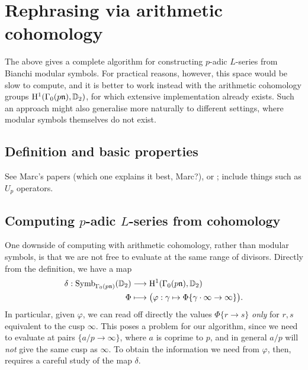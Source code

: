 \documentclass[a4paper,10pt]{article}
\numberwithin{equation}{section}
\begin{document}


\section{Rephrasing via arithmetic cohomology}
The above gives a complete algorithm for constructing $p$-adic $L$-series from Bianchi modular symbols. For practical reasons, however, this space would be slow to compute, and it is better to work instead with the arithmetic cohomology groups $\mathrm{H}^1(\Gamma_0(p\mathfrak{n}),\mathbb{D}_2)$, for which extensive implementation already exists. Such an approach might also generalise more naturally to different settings, where modular symbols themselves do not exist.

\subsection{Definition and basic properties}
See Marc's papers (which one explains it best, Marc?), or  \cite{PP09}; include things such as $U_p$ operators.



\subsection{Computing \texorpdfstring{$p$}{p}-adic \texorpdfstring{$L$}{L}-series from cohomology}

One downside of computing with arithmetic cohomology, rather than modular symbols, is that we are not free to evaluate at the same range of divisors. Directly from the definition, we have a map
\begin{align*}
	\delta : \mathrm{Symb}_{\Gamma_0(p\mathfrak{n})}(\mathbb{D}_2) &\longrightarrow \mathrm{H}^1(\Gamma_0(p\mathfrak{n}),\mathbb{D}_2)\\
    \Phi &\longmapsto \big(\varphi: \gamma \mapsto \Phi\{\gamma\cdot\infty \rightarrow \infty\}\big).
\end{align*}
In particular, given $\varphi$, we can read off directly the values $\Phi\{r \to s\}$ \emph{only} for $r,s$ equivalent to the cusp $\infty$. This poses a problem for our algorithm, since we need to evaluate at pairs $\{a/p \to \infty\}$, where $a$ is coprime to $p$, and in general $a/p$ will \emph{not} give the same cusp as $\infty$. To obtain the information we need from $\varphi$, then, requires a careful study of the map $\delta$.
\end{document}

